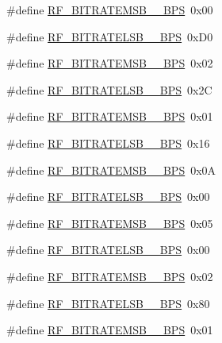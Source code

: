 \begin{DoxyCompactItemize}
\#define \mbox{\hyperlink{sx1276_regs-_fsk_8h_a68aec0128102e04f2699befbf244f5ec}{R\+F\+\_\+\+B\+I\+T\+R\+A\+T\+E\+M\+S\+B\+\_\+\_\+\+B\+PS}}~0x00
\item 
\#define \mbox{\hyperlink{sx1276_regs-_fsk_8h_a918d453d557cfd2e89c2310591290ef6}{R\+F\+\_\+\+B\+I\+T\+R\+A\+T\+E\+L\+S\+B\+\_\+\_\+\+B\+PS}}~0x\+D0
\item 
\#define \mbox{\hyperlink{sx1276_regs-_fsk_8h_a5c8867e729d049e6b01d95f17daeaa43}{R\+F\+\_\+\+B\+I\+T\+R\+A\+T\+E\+M\+S\+B\+\_\+\_\+\+B\+PS}}~0x02
\item 
\#define \mbox{\hyperlink{sx1276_regs-_fsk_8h_a4b990574403a3171c4bf1ef56f87076c}{R\+F\+\_\+\+B\+I\+T\+R\+A\+T\+E\+L\+S\+B\+\_\+\_\+\+B\+PS}}~0x2C
\item 
\#define \mbox{\hyperlink{sx1276_regs-_fsk_8h_a4f3568a645d981cc5d56d5892fd79fea}{R\+F\+\_\+\+B\+I\+T\+R\+A\+T\+E\+M\+S\+B\+\_\+\_\+\+B\+PS}}~0x01
\item 
\#define \mbox{\hyperlink{sx1276_regs-_fsk_8h_a6677546d2936ed5f36a259f13c123d00}{R\+F\+\_\+\+B\+I\+T\+R\+A\+T\+E\+L\+S\+B\+\_\+\_\+\+B\+PS}}~0x16
\item 
\#define \mbox{\hyperlink{sx1276_regs-_fsk_8h_a8d2d2c7221965aeac9af067528723746}{R\+F\+\_\+\+B\+I\+T\+R\+A\+T\+E\+M\+S\+B\+\_\+\_\+\+B\+PS}}~0x0A
\item 
\#define \mbox{\hyperlink{sx1276_regs-_fsk_8h_a382c67b25793c0884e7bfe662dfb06c6}{R\+F\+\_\+\+B\+I\+T\+R\+A\+T\+E\+L\+S\+B\+\_\+\_\+\+B\+PS}}~0x00
\item 
\#define \mbox{\hyperlink{sx1276_regs-_fsk_8h_a783ebd0eeb85cb90ed09736f058122ed}{R\+F\+\_\+\+B\+I\+T\+R\+A\+T\+E\+M\+S\+B\+\_\+\_\+\+B\+PS}}~0x05
\item 
\#define \mbox{\hyperlink{sx1276_regs-_fsk_8h_af7a1f67d376fd019e9b883a080b35700}{R\+F\+\_\+\+B\+I\+T\+R\+A\+T\+E\+L\+S\+B\+\_\+\_\+\+B\+PS}}~0x00
\item 
\#define \mbox{\hyperlink{sx1276_regs-_fsk_8h_a7b42c7402e7d73f2e75d753085badf7a}{R\+F\+\_\+\+B\+I\+T\+R\+A\+T\+E\+M\+S\+B\+\_\+\_\+\+B\+PS}}~0x02
\item 
\#define \mbox{\hyperlink{sx1276_regs-_fsk_8h_a1780bbfac40913821e859a35c0a7eae2}{R\+F\+\_\+\+B\+I\+T\+R\+A\+T\+E\+L\+S\+B\+\_\+\_\+\+B\+PS}}~0x80
\item 
\#define \mbox{\hyperlink{sx1276_regs-_fsk_8h_a899b8e6397e082b4d95f589ba51093b0}{R\+F\+\_\+\+B\+I\+T\+R\+A\+T\+E\+M\+S\+B\+\_\+\_\+\+B\+PS}}~0x01
\item 

\end{DoxyCompactItemize}
